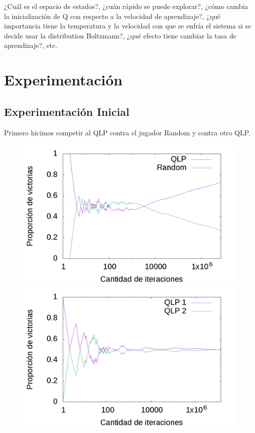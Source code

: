 \documentclass[10pt, a4paper]{article}
\begin{document}
¿Cuál es el espacio de estados?, ¿cuán rápido se puede explorar?, ¿cómo cambia la inicialización de Q con respecto a la velocidad de aprendizaje?, ¿qué importancia tiene la temperatura y la velocidad con que se enfría el sistema si se decide usar la distribution Boltzmann?, ¿qué efecto tiene cambiar la tasa de aprendizaje?, etc.

\section{Experimentación}

\subsection{Experimentación Inicial}

Primero hicimos competir al QLP contra el jugador Random y contra otro QLP.

\begin{figure}[H]
  \begin{minipage}[c]{1\textwidth}
	\includegraphics[scale=0.2]{Initial/QvR.png}
	\includegraphics[scale=0.2]{Initial/QvQ.png}
  \end{minipage}
\end{figure}
\end{document}
